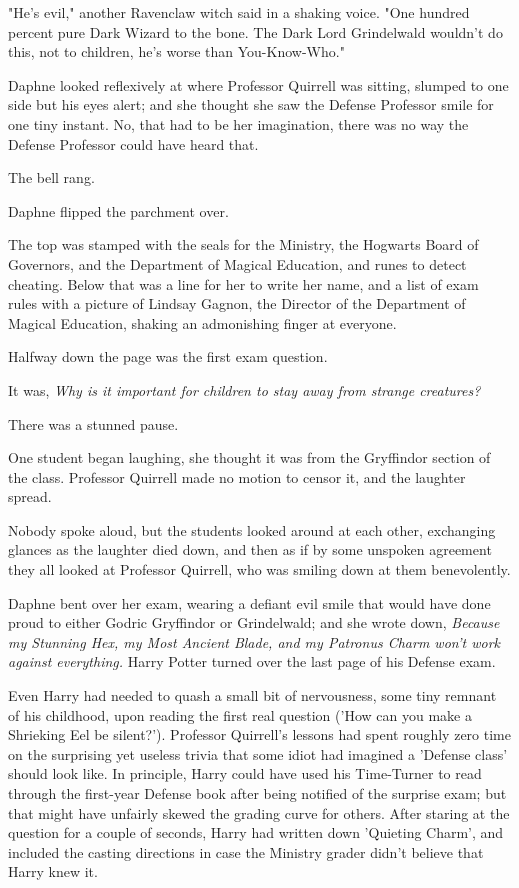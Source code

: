"He's evil," another Ravenclaw witch said in a shaking voice. "One hundred 
percent pure Dark Wizard to the bone. The Dark Lord Grindelwald wouldn't do 
this, not to children, he's worse than You-Know-Who."

Daphne looked reflexively at where Professor Quirrell was sitting, slumped to 
one side but his eyes alert; and she thought she saw the Defense Professor 
smile for one tiny instant. No, that had to be her imagination, there was no 
way the Defense Professor could have heard that.

The bell rang.

Daphne flipped the parchment over.

The top was stamped with the seals for the Ministry, the Hogwarts Board of 
Governors, and the Department of Magical Education, and runes to detect 
cheating. Below that was a line for her to write her name, and a list of exam 
rules with a picture of Lindsay Gagnon, the Director of the Department of 
Magical Education, shaking an admonishing finger at everyone.

Halfway down the page was the first exam question.

It was, \emph{Why is it important for children to stay away from strange 
creatures?}

There was a stunned pause.

One student began laughing, she thought it was from the Gryffindor section of 
the class. Professor Quirrell made no motion to censor it, and the laughter 
spread.

Nobody spoke aloud, but the students looked around at each other, exchanging 
glances as the laughter died down, and then as if by some unspoken agreement 
they all looked at Professor Quirrell, who was smiling down at them 
benevolently.

Daphne bent over her exam, wearing a defiant evil smile that would have done 
proud to either Godric Gryffindor or Grindelwald; and she wrote down, 
\emph{Because my Stunning Hex, my Most Ancient Blade, and my Patronus Charm 
won't work against everything.}
\sbreak
Harry Potter turned over the last page of his Defense exam.

Even Harry had needed to quash a small bit of nervousness, some tiny remnant of 
his childhood, upon reading the first real question ('How can you make a 
Shrieking Eel be silent?'). Professor Quirrell's lessons had spent roughly zero 
time on the surprising yet useless trivia that some idiot had imagined a 
'Defense class' should look like. In principle, Harry could have used his 
Time-Turner to read through the first-year Defense book after being notified of 
the surprise exam; but that might have unfairly skewed the grading curve for 
others. After staring at the question for a couple of seconds, Harry had 
written down 'Quieting Charm', and included the casting directions in case the 
Ministry grader didn't believe that Harry knew it.


